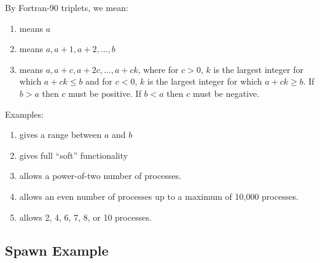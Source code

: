 \begin{description}
By Fortran-90 triplets, we mean:
\begin{enumerate}
\item {} means $a$
\item {} means $a, a+1, a+2, \ldots, b$
\item {} means $a, a+c, a+2c, \ldots, a+ck$,
where for $c > 0$, $k$ is the largest integer for which
$a+ck \leq b$ and for $c < 0$, $k$ is the largest integer
for which $a+ck \geq b$.
If $b > a$ then $c$ must be positive. If $b < a$ then $c$ must be negative.
\end{enumerate}
Examples:
\begin{enumerate}
\item {} gives a range between $a$ and $b$
\item {} gives full ``soft'' functionality
\item {} allows
a power-of-two number of processes.
\item {} allows an even number of processes up to a maximum of 10,000 processes.
\item {} allows 2, 4, 6, 7, 8, or 10 processes.
\end{enumerate}

\end{description}



\subsection{Spawn Example}
\label{subsec:examples}


